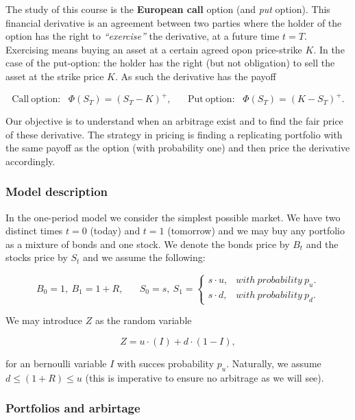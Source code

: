 \documentclass[
]{book}
\begin{document}
The study of this course is the \textbf{European call} option (and \emph{put} option). This financial derivative is an agreement between two parties where the holder of the option has the right to \emph{``exercise''} the derivative, at a future time \(t=T\). Exercising means buying an asset at a certain agreed opon price-strike \(K\). In the case of the put-option: the holder has the right (but not obligation) to sell the asset at the strike price \(K\). As such the derivative has the payoff

\[\text{Call}\ \text{option:}\hspace{10pt}\Phi(S_T)=(S_T-K)^+,\hspace{20pt}\text{Put}\ \text{option:}\hspace{10pt}\Phi(S_T)=(K-S_T)^+.\]

Our objective is to understand when an arbitrage exist and to find the fair price of these derivative. The strategy in pricing is finding a replicating portfolio with the same payoff as the option (with probability one) and then price the derivative accordingly.

\hypertarget{model-description}{%
\subsubsection{Model description}\label{model-description}}

In the one-period model we consider the simplest possible market. We have two distinct times \(t=0\) (today) and \(t=1\) (tomorrow) and we may buy any portfolio as a mixture of bonds and one stock. We denote the bonds price by \(B_t\) and the stocks price by \(S_t\) and we assume the following:

\[
B_0=1,\ B_1=1+R,\hspace{20pt}S_0=s,\ S_1=\left\{\begin{matrix}s\cdot u, & with\ probability\ p_u.\\s\cdot d, & with\ probability\ p_d.\end{matrix}\right.
\]

We may introduce \(Z\) as the random variable

\[
Z=u\cdot (I)+d\cdot (1-I),
\]

for an bernoulli variable \(I\) with succes probability \(p_u\). Naturally, we assume \(d\le (1+R)\le u\) (this is imperative to ensure no arbitrage as we will see).

\hypertarget{portfolios-and-arbirtage}{%
\subsubsection{Portfolios and arbirtage}\label{portfolios-and-arbirtage}}
\end{document}
